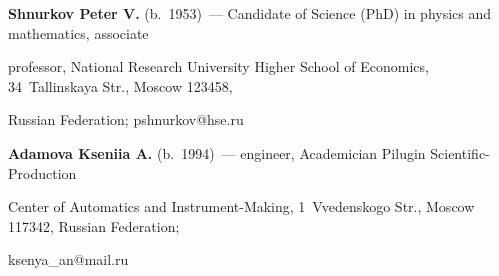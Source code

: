 \noindent

\textbf{Shnurkov Peter V.} (b.\ 1953)~--- Candidate of Science (PhD) in physics and mathematics, associate 

professor, National Research University Higher School of Economics, 34~Tallinskaya Str., Moscow 123458, 

Russian Federation; \mbox{pshnurkov@hse.ru}



\vspace*{3pt}



\noindent

\textbf{Adamova Kseniia A.} (b.\ 1994)~--- engineer, Academician Pilugin Scientific-Production 

Center of Automatics and Instrument-Making, 1~Vvedenskogo Str., Moscow 117342, Russian Federation; 


\mbox{ksenya\_an@mail.ru}



  

\label{end\stat}



\renewcommand{\bibname}{\protect\rm Литература} 

